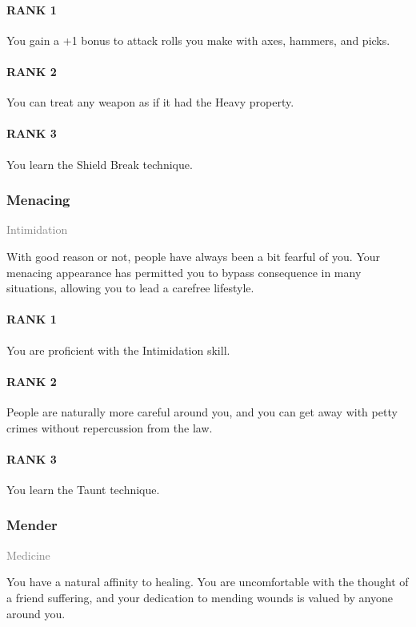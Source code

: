 \paragraph{RANK 1} You gain a +1 bonus to attack rolls you make with axes, hammers, and picks.
\paragraph{RANK 2} You can treat any weapon as if it had the Heavy property.
\paragraph{RANK 3} You learn the Shield Break technique.

\subsubsection{Menacing} \label{feat::menacing}
\small{\textcolor{gray}{Intimidation}}

\normalsize
With good reason or not, people have always been a bit fearful of you.
Your menacing appearance has permitted you to bypass consequence in many situations, allowing you to lead a carefree lifestyle.
\paragraph{RANK 1} You are proficient with the Intimidation skill.
\paragraph{RANK 2} People are naturally more careful around you, and you can get away with petty crimes without repercussion from the law.
\paragraph{RANK 3} You learn the Taunt technique.

\subsubsection{Mender} \label{feat::mender}
\small{\textcolor{gray}{Medicine}}

\normalsize
You have a natural affinity to healing.
You are uncomfortable with the thought of a friend suffering, and your dedication to mending wounds is valued by anyone around you.
